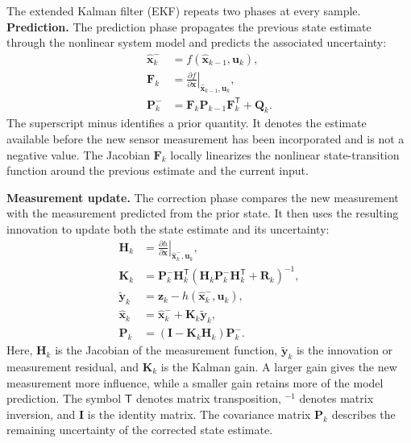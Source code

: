 \documentclass[
    a4paper,
    12pt,
    titlepage,
    bibliography=totoc,
    twoside=on,
    parskip=false,
    numbers=noenddot,
    cleardoublepage=empty,
    DIV=12,
    BCOR=12.0mm,
    headheight=36pt,
    headings=openright
]{scrreprt}
\begin{document}
The extended Kalman filter (EKF) repeats two phases at every sample. \textbf{Prediction.} The prediction phase propagates the previous state estimate through the nonlinear system model and predicts the associated uncertainty:
\begin{subequations}\label{eq:fundamental_ekf_prediction}
\begin{align}
    \hat{\mathbf{x}}^-_k
    &=f(\hat{\mathbf{x}}_{k-1},\mathbf{u}_k),
    \label{eq:fundamental_ekf_state_prediction}\\
    \mathbf{F}_k
    &=\left.\frac{\partial f}{\partial \mathbf{x}}\right|_{\hat{\mathbf{x}}_{k-1},\mathbf{u}_k},
    \label{eq:fundamental_ekf_state_jacobian}\\
    \mathbf{P}^-_k
    &=\mathbf{F}_k\mathbf{P}_{k-1}\mathbf{F}_k^\mathsf{T}+\mathbf{Q}_k.
    \label{eq:fundamental_ekf_covariance_prediction}
\end{align}
\end{subequations}
The superscript minus identifies a prior quantity. It denotes the estimate available before the new sensor measurement has been incorporated and is not a negative value. The Jacobian $\mathbf{F}_k$ locally linearizes the nonlinear state-transition function around the previous estimate and the current input.

\textbf{Measurement update.} The correction phase compares the new measurement with the measurement predicted from the prior state. It then uses the resulting innovation to update both the state estimate and its uncertainty:
\begin{subequations}\label{eq:fundamental_ekf_update}
\begin{align}
    \mathbf{H}_k
    &=\left.\frac{\partial h}{\partial \mathbf{x}}\right|_{\hat{\mathbf{x}}^-_k,\mathbf{u}_k},
    \label{eq:fundamental_ekf_measurement_jacobian}\\
    \mathbf{K}_k
    &=\mathbf{P}^-_k\mathbf{H}_k^\mathsf{T}
      \left(\mathbf{H}_k\mathbf{P}^-_k\mathbf{H}_k^\mathsf{T}+\mathbf{R}_k\right)^{-1},
    \label{eq:fundamental_ekf_gain}\\
    \tilde{\mathbf{y}}_k
    &=\mathbf{z}_k-h(\hat{\mathbf{x}}^-_k,\mathbf{u}_k),
    \label{eq:fundamental_ekf_innovation}\\
    \hat{\mathbf{x}}_k
    &=\hat{\mathbf{x}}^-_k+\mathbf{K}_k\tilde{\mathbf{y}}_k,
    \label{eq:fundamental_ekf_state_update}\\
    \mathbf{P}_k
    &=\left(\mathbf{I}-\mathbf{K}_k\mathbf{H}_k\right)\mathbf{P}^-_k.
    \label{eq:fundamental_ekf_covariance_update}
\end{align}
\end{subequations}
Here, $\mathbf{H}_k$ is the Jacobian of the measurement function, $\tilde{\mathbf{y}}_k$ is the innovation or measurement residual, and $\mathbf{K}_k$ is the Kalman gain. A larger gain gives the new measurement more influence, while a smaller gain retains more of the model prediction. The symbol $\mathsf{T}$ denotes matrix transposition, $^{-1}$ denotes matrix inversion, and $\mathbf{I}$ is the identity matrix. The covariance matrix $\mathbf{P}_k$ describes the remaining uncertainty of the corrected state estimate.
\end{document}
